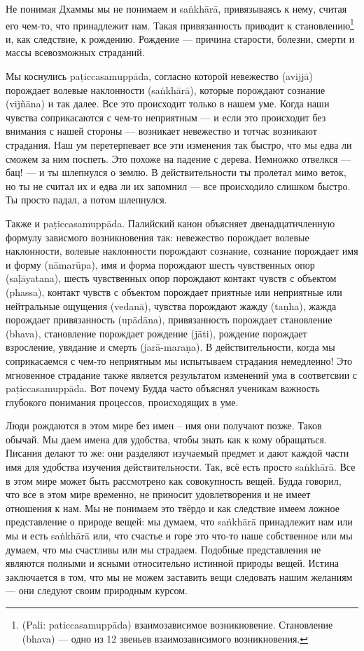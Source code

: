 Не понимая Дхаммы мы не понимаем и sa\.nkh\={a}r\={a}, привязываясь к нему, считая его чем-то, что принадлежит нам. Такая привязанность приводит к становлению\footnote{(Pali: paticcasamupp\={a}da) взаимозависимое возникновение. Становление (bhava) — одно из 12 звеньев взаимозависимого возникновения.} и, как следствие, к рождению. Рождение — причина старости, болезни, смерти и массы всевозможных страданий.

Мы коснулись pa\d{t}iccasamupp\={a}da, согласно которой невежество (avijj\={a}) порождает волевые наклонности (sa\.nkh\={a}r\={a}), которые порождают сознание (vij\~{n}\={a}na) и так далее. Все это происходит только в нашем уме. Когда наши чувства соприкасаются с чем-то неприятным — и если это происходит без внимания с нашей стороны — возникает невежество и тотчас возникают страдания. Наш ум перетерпевает все эти изменения так быстро, что мы едва ли сможем за ним поспеть. Это похоже на падение с дерева. Немножко отвелкся — бац! — и ты шлепнулся о землю. В действительности ты пролетал мимо веток, но ты не считал их и едва ли их запомнил — все происходило слишком быстро. Ты просто падал, а потом шлепнулся.

Также и  pa\d{t}iccasamupp\={a}da. Палийский канон объясняет двенадцатичленную формулу зависмого возникновения так: невежество порождает волевые наклонности, волевые наклонности порождают сознание, сознание порождает имя и форму (n\={a}mar\={u}pa), имя и форма порождают шесть чувственных опор (sa\d{l}\={a}yatana), шесть чувственных опор порождают контакт чувств с объектом (phassa), контакт чувств с объектом порождает приятные или неприятные или нейтральные ощущения (vedan\={a}), чувства порождают жажду (ta\d{n}ha), жажда порождает привязанность (up\={a}d\={a}na), привязанность порождает становление (bhava), становление порождает рождение (j\={a}ti), рождение порождает взросление, увядание и смерть (jar\={a}-mara\d{n}a). В действительности, когда мы соприкасаемся с чем-то неприятным мы испытываем страдания немедленно! Это мгновенное страдание также является результатом изменений ума в соответсвии с  pa\d{t}iccasamupp\={a}da. Вот почему Будда часто объяснял ученикам важность глубокого понимания процессов, происходящих в уме.

Люди рождаются в этом мире без имен – имя они получают позже. Таков обычай. Мы даем имена для удобства, чтобы знать как к кому обращаться. Писания делают то же: они разделяют изучаемый предмет и дают каждой части имя для удобства изучения действительности. Так, всё есть просто sa\.nkh\={a}r\={a}. Все в этом мире может быть рассмотрено как совокупность вещей. Будда говорил, что все в этом мире временно, не приносит удовлетворения и не имеет отношения к нам. Мы не понимаем это твёрдо и как следствие имеем ложное представление о природе вещей: мы думаем, что sa\.nkh\={a}r\={a} принадлежит нам или мы и есть sa\.nkh\={a}r\={a} или, что счастье и горе это что-то наше собственное или мы думаем, что мы счастливы или мы страдаем. Подобные представления не являются полными и ясными относительно истинной природы вещей. Истина заключается в том, что мы не можем заставить вещи следовать нашим желаниям — они следуют своим природным курсом.

